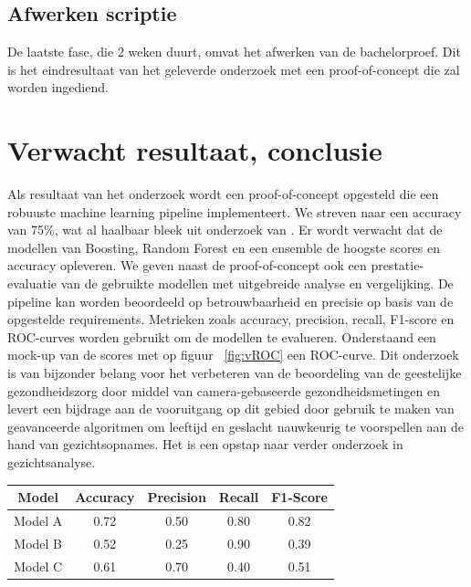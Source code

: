 \subsection{Afwerken scriptie}
\label{sub:vafwerken_scriptie}
De laatste fase, die 2 weken duurt, omvat het afwerken van de bachelorproef. Dit is het eindresultaat van het geleverde onderzoek met een proof-of-concept die zal worden ingediend. 


\section{Verwacht resultaat, conclusie}%
\label{sec:vverwachte_resultaten}

Als resultaat van het onderzoek wordt een proof-of-concept opgesteld die een robuuste machine learning pipeline implementeert. We streven naar een accuracy van 75\%, wat al haalbaar bleek uit onderzoek van \textcite{Sanil2023}. Er wordt verwacht dat de modellen van Boosting, Random Forest en een ensemble de hoogste scores en accuracy opleveren. We geven naast de proof-of-concept ook een prestatie-evaluatie van de gebruikte modellen met uitgebreide analyse en vergelijking. De pipeline kan worden beoordeeld op betrouwbaarheid en precisie op basis van de opgestelde requirements. Metrieken zoals accuracy, precision, recall, F1-score en ROC-curves worden gebruikt om de modellen te evalueren. Onderstaand een mock-up van de scores met op figuur {~\ref{fig:vROC}} een ROC-curve. Dit onderzoek is van bijzonder belang voor het verbeteren van de beoordeling van de geestelijke gezondheidszorg door middel van camera-gebaseerde gezondheidsmetingen en levert een bijdrage aan de vooruitgang op dit gebied door gebruik te maken van geavanceerde algoritmen om leeftijd en geslacht nauwkeurig te voorspellen aan de hand van gezichtsopnames. Het is een opstap naar verder onderzoek in gezichtsanalyse. 

\begin{center}
    \begin{tabular}{||c c c c c||} 
        \hline
        Model & Accuracy & Precision & Recall & F1-Score \\ 
        \hline
        Model A & 0.72 & 0.50 & 0.80 & 0.82 \\ 
        \hline
        Model B & 0.52 & 0.25 & 0.90 & 0.39 \\
        \hline
        Model C & 0.61 & 0.70 & 0.40 & 0.51 \\
    \end{tabular}
\end{center}

